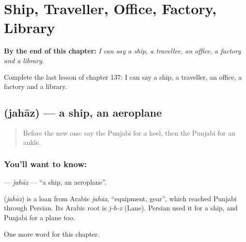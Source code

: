 
\chapter{Ship, Traveller, Office, Factory, Library}
\label{ch:pa-ship-traveller-office-factory-library}

\begin{chapteropening}
\textbf{By the end of this chapter:} \emph{I can say a ship, a traveller, an office, a factory and a library.}

Complete the last lesson of chapter 137: I can say a ship, a traveller, an office, a factory and a library.
\end{chapteropening}

\section[\texorpdfstring{\pa{ਜਹਾਜ਼} (jahāz)}{ਜਹਾਜ਼ (jahāz)}]{ (jahāz) — a ship, an aeroplane}

\label{lesson:PA-C137-jahaz}



\begin{quote}
Before the new one: say the Punjabi for a heel, then the Punjabi for an ankle.
\end{quote}

\subsection*{You'll want to know: }
\textbf{} — \emph{jahāz} — \textquotedblleft{}a ship, an aeroplane\textquotedblright{}.

\begin{cousinweb}
\textbf{} (\emph{jahāz}) is a loan from Arabic \emph{jahāz}, \textquotedblleft{}equipment, gear\textquotedblright{}, which reached Punjabi through Persian. Its Arabic root is \emph{j-h-z} (Lane). Persian used it for a ship, and Punjabi for a plane too.
\end{cousinweb}

\begin{grammarlens}[title={What you've built}]
One more word for this chapter.
\end{grammarlens}


